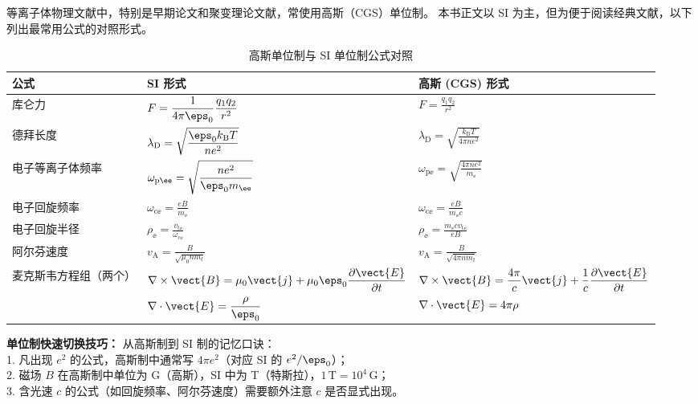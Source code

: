 等离子体物理文献中，特别是早期论文和聚变理论文献，常使用高斯（CGS）单位制。
本书正文以 SI 为主，但为便于阅读经典文献，以下列出最常用公式的对照形式。

\begin{table}[htbp]
\centering
\caption{高斯单位制与 SI 单位制公式对照}
\begin{tabular}{@{}lp{5.5cm}p{5.5cm}@{}}
\toprule
\textbf{公式} & \textbf{SI 形式} & \textbf{高斯 (CGS) 形式} \\
\midrule
库仑力 & $\displaystyle F=\frac{1}{4\pi\eps_0}\frac{q_1 q_2}{r^2}$ & $\displaystyle F=\frac{q_1 q_2}{r^2}$ \\
\midrule
德拜长度 & $\displaystyle \lambda_\mathrm{D}=\sqrt{\frac{\eps_0 k_\mathrm{B} T}{n e^2}}$ & $\displaystyle \lambda_\mathrm{D}=\sqrt{\frac{k_\mathrm{B} T}{4\pi n e^2}}$ \\
\midrule
电子等离子体频率 & $\displaystyle \omega_{\mathrm{p}\ee}=\sqrt{\frac{n e^2}{\eps_0 m_\ee}}$ & $\displaystyle \omega_{\mathrm{p}\ee}=\sqrt{\frac{4\pi n e^2}{m_\ee}}$ \\
\midrule
电子回旋频率 & $\displaystyle \omega_{\mathrm{c}\ee}=\frac{e B}{m_\ee}$ & $\displaystyle \omega_{\mathrm{c}\ee}=\frac{e B}{m_\ee c}$ \\
\midrule
电子回旋半径 & $\displaystyle \rho_\ee=\frac{v_{\mathrm{t}\ee}}{\omega_{\mathrm{c}\ee}}$ & $\displaystyle \rho_\ee=\frac{m_\ee c v_{\mathrm{t}\ee}}{e B}$ \\
\midrule
阿尔芬速度 & $\displaystyle v_\mathrm{A}=\frac{B}{\sqrt{\mu_0 n m_\ii}}$ & $\displaystyle v_\mathrm{A}=\frac{B}{\sqrt{4\pi n m_\ii}}$ \\
\midrule
麦克斯韦方程组（两个） & $\displaystyle \nabla\times\vect{B}=\mu_0\vect{j}+\mu_0\eps_0\frac{\partial\vect{E}}{\partial t}$ & $\displaystyle \nabla\times\vect{B}=\frac{4\pi}{c}\vect{j}+\frac{1}{c}\frac{\partial\vect{E}}{\partial t}$ \\
 & $\displaystyle \nabla\cdot\vect{E}=\frac{\rho}{\eps_0}$ & $\displaystyle \nabla\cdot\vect{E}=4\pi\rho$ \\
\bottomrule
\end{tabular}
\end{table}

\begin{tip}
\textbf{单位制快速切换技巧：}
从高斯制到 SI 制的记忆口诀：\\
1. 凡出现 $e^2$ 的公式，高斯制中通常写 $4\pi e^2$（对应 SI 的 $e^2/\eps_0$）；\\
2. 磁场 $B$ 在高斯制中单位为 G（高斯），SI 中为 T（特斯拉），$1\,\mathrm{T}=10^4\,\mathrm{G}$；\\
3. 含光速 $c$ 的公式（如回旋频率、阿尔芬速度）需要额外注意 $c$ 是否显式出现。
\end{tip}


